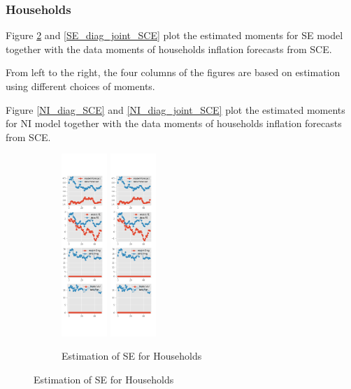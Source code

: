 \documentclass[]{article}
\begin{document}
\subsubsection{Households}


Figure \ref{SE_diag_SCE} and \ref{SE_diag_joint_SCE} plot the estimated moments for SE model together with the data moments of households inflation forecasts from SCE. 

From left to the right, the four columns of the figures are based on estimation using different choices of moments. 

Figure \ref{NI_diag_SCE} and \ref{NI_diag_joint_SCE} plot the estimated moments for NI model together with the data moments of households inflation forecasts from SCE. 

\begin{figure}[htbp]
	\centering
	\begin{subfigure}[b]{\textwidth}
		\centering
		\caption{Estimation of SE for Households}
		\label{SE_diag_SCE}
		\includegraphics[width=0.19\textwidth]{figures/sce_se_est_diag0.png}
		\includegraphics[width=0.19\textwidth]{figures/sce_se_est_diag1.png}

\end{subfigure}
\end{figure}
\end{document}

